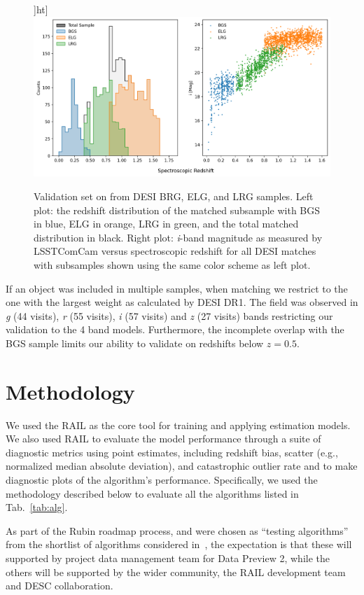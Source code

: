 \begin{figure}]ht]
    \centering
    \includegraphics[width=.8\linewidth]{figures/desi_sample_histogram.png}
    \caption{Validation set on  from DESI BRG, ELG, and LRG samples. Left plot: the redshift distribution of the matched subsample with BGS in blue, ELG in orange, LRG in green, and the total matched distribution in black. Right plot: \textit{i}-band magnitude as measured by LSSTComCam versus spectroscopic redshift for all DESI matches with subsamples shown using the same color scheme as left plot.}
    \label{fig:desi-subsample-hist}
\end{figure}

If an object was included in multiple samples, when matching we restrict to the one with the largest weight as calculated by DESI DR1.
The  field was observed in \textit{g} (44 visits), \textit{r} (55 visits), \textit{i} (57 visits) and \textit{z} (27 visits) bands restricting our validation to the 4 band models.
Furthermore, the incomplete overlap with the BGS sample limits our ability to validate on redshifts below $z=0.5$. 


\section{Methodology}
\label{sec:method:0}

We used the RAIL as the core tool for training and applying \photoz estimation models.   We also used RAIL to evaluate the model performance through a suite of diagnostic metrics using \photoz point estimates, including redshift bias, scatter (e.g., normalized median absolute deviation), and catastrophic outlier rate and to make diagnostic plots of the algorithm's performance.  Specifically, we used the methodology described below to evaluate all the algorithms listed in Tab.~\ref{tab:alg}.

As part of the Rubin \photoz roadmap process,  and  were chosen as ``testing algorithms'' from the shortlist of algorithms considered in~\citep{DMTN-049}, the expectation is that these will supported by project data management team for Data Preview 2,  while the others will be supported by the wider community, the RAIL development team and DESC collaboration.


